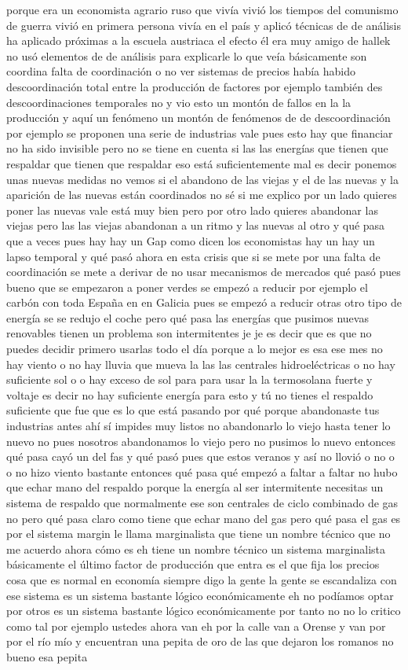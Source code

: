 porque era un economista agrario ruso que vivía vivió los tiempos del comunismo de guerra vivió en primera persona vivía en el país y aplicó técnicas de de análisis ha aplicado próximas a la escuela austriaca el efecto él era muy amigo de hallek no usó elementos de de análisis para explicarle lo que veía básicamente son coordina falta de coordinación o no ver sistemas de precios había habido descoordinación total entre la producción de factores por ejemplo también des descoordinaciones temporales no y vio esto un montón de fallos en la la producción y aquí un fenómeno un montón de fenómenos de de descoordinación por ejemplo se proponen una serie de industrias vale pues esto hay que financiar no ha sido invisible pero no se tiene en cuenta si las las energías que tienen que respaldar que tienen que respaldar eso está suficientemente mal es decir ponemos unas nuevas medidas no vemos si el abandono de las viejas y el de las nuevas y la aparición de las nuevas están coordinados no sé si me explico por un lado quieres poner las nuevas vale está muy bien pero por otro lado quieres abandonar las viejas pero las las viejas abandonan a un ritmo y las nuevas al otro y qué pasa que a veces pues hay hay un Gap como dicen los economistas hay un hay un lapso temporal y qué pasó ahora en esta crisis que si se mete por una falta de coordinación se mete a derivar de no usar mecanismos de mercados qué pasó pues bueno que se empezaron a poner verdes se empezó a reducir por ejemplo el carbón con toda España en en Galicia pues se empezó a reducir otras otro tipo de energía se se redujo el coche pero qué pasa las energías que pusimos nuevas renovables tienen un problema son intermitentes je je es decir que es que no puedes decidir primero usarlas todo el día porque a lo mejor es esa ese mes no hay viento o no hay lluvia que mueva la las las centrales hidroeléctricas o no hay suficiente sol o o hay exceso de sol para para usar la la termosolana fuerte y voltaje es decir no hay suficiente energía para esto y tú no tienes el respaldo suficiente que fue que es lo que está pasando por qué porque abandonaste tus industrias antes ahí sí impides muy listos no abandonarlo lo viejo hasta tener lo nuevo no pues nosotros abandonamos lo viejo pero no pusimos lo nuevo entonces qué pasa cayó un del fas y qué pasó pues que estos veranos y así no llovió o no o o no hizo viento bastante entonces qué pasa qué empezó a faltar a faltar no hubo que echar mano del respaldo porque la energía al ser intermitente necesitas un sistema de respaldo que normalmente ese son centrales de ciclo combinado de gas no pero qué pasa claro como tiene que echar mano del gas pero qué pasa el gas es por el sistema margin le llama marginalista que tiene un nombre técnico que no me acuerdo ahora cómo es eh tiene un nombre técnico un sistema marginalista básicamente el último factor de producción que entra es el que fija los precios cosa que es normal en economía siempre digo la gente la gente se escandaliza con ese sistema es un sistema bastante lógico económicamente eh no podíamos optar por otros es un sistema bastante lógico económicamente por tanto no no lo critico como tal por ejemplo ustedes ahora van eh por la calle van a Orense y van por por el río mío y encuentran una pepita de oro de las que dejaron los romanos no bueno esa pepita 